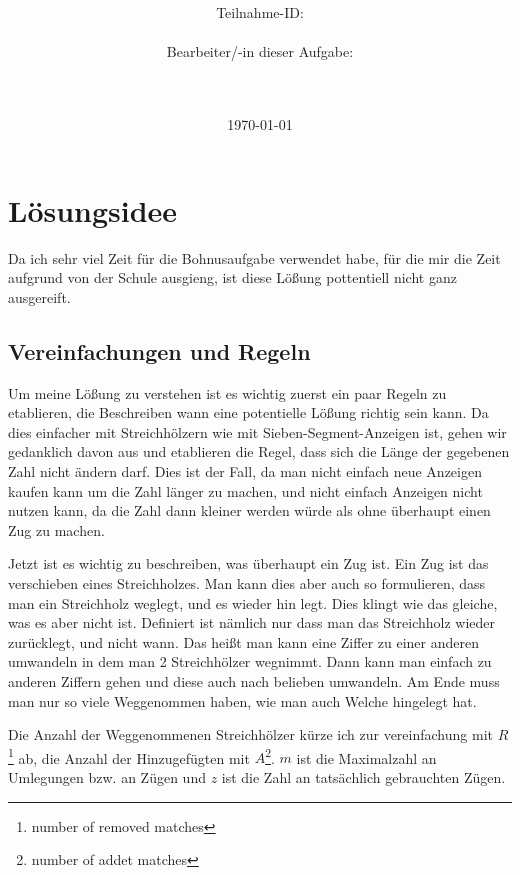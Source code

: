 \documentclass[a4paper,10pt,ngerman]{scrartcl}
\title{\textbf{\Huge\Aufgabe}}
\author{\LARGE Teilnahme-ID: \LARGE \TeilnahmeId \\\\
	    \LARGE Bearbeiter/-in dieser Aufgabe: \\ 
	    \LARGE \Name\\\\}
\date{\LARGE\today}
\begin{document}
\maketitle

\setcounter{tocdepth}{3}
\tableofcontents

\vspace{0.5cm}

\section{Lösungsidee}

Da ich sehr viel Zeit für die Bohnusaufgabe verwendet habe, für die mir die Zeit aufgrund von der Schule ausgieng, ist diese Lößung pottentiell nicht ganz ausgereift.

\subsection{Vereinfachungen und Regeln}

Um meine Lößung zu verstehen ist es wichtig zuerst ein paar Regeln zu etablieren, die Beschreiben wann eine potentielle Lößung richtig sein kann. Da dies einfacher mit Streichhölzern wie mit Sieben-Segment-Anzeigen ist, gehen wir gedanklich davon aus und etablieren die Regel, dass sich die Länge der gegebenen Zahl nicht ändern darf. Dies ist der Fall, da man nicht einfach neue Anzeigen kaufen kann um die Zahl länger zu machen, und nicht einfach Anzeigen nicht nutzen kann, da die Zahl dann kleiner werden würde als ohne überhaupt einen Zug zu machen.

Jetzt ist es wichtig zu beschreiben, was überhaupt ein Zug ist. Ein Zug ist das verschieben eines Streichholzes. Man kann dies aber auch so formulieren, dass man ein Streichholz weglegt, und es wieder hin legt. Dies klingt wie das gleiche, was es aber nicht ist. Definiert ist nämlich nur dass man das Streichholz wieder zurücklegt, und nicht wann. Das heißt man kann eine Ziffer zu einer anderen umwandeln in dem man 2 Streichhölzer wegnimmt. Dann kann man einfach zu anderen Ziffern gehen und diese auch nach belieben umwandeln. Am Ende muss man nur so viele Weggenommen haben, wie man auch Welche hingelegt hat.

Die Anzahl der Weggenommenen Streichhölzer kürze ich zur vereinfachung mit $R$\footnote{number of removed matches} ab, die Anzahl der Hinzugefügten mit $A$\footnote{number of addet matches}. $m$ ist die Maximalzahl an Umlegungen bzw. an Zügen und $z$ ist die Zahl an tatsächlich gebrauchten Zügen.
\end{document}
